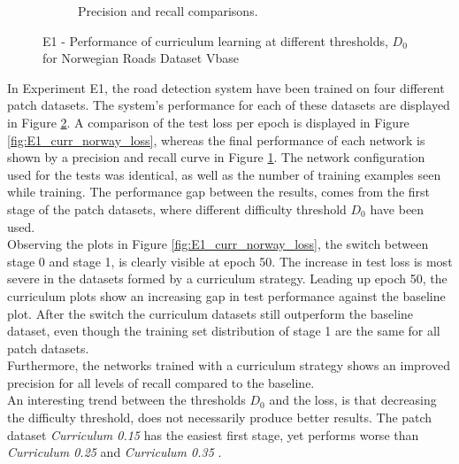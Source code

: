 \begin{figure}[!ht]
\begin{subfigure}{0.48\textwidth}
\caption{Precision and recall comparisons.} \label{fig:E1_curr_norway_pr}
\end{subfigure}
\hspace*{\fill} %
\caption{E1 - Performance of curriculum learning at different thresholds, $D_{0}$ for Norwegian Roads Dataset Vbase} \label{fig:E1_curriculum_norway}
\end{figure}

In Experiment E1, the road detection system have been trained on four different patch datasets. The system's performance for each of these datasets are displayed in Figure \ref{fig:E1_curriculum_norway}. A comparison of the test loss per epoch is displayed in Figure \ref{fig:E1_curr_norway_loss}, whereas the final performance of each network is shown by a precision and recall curve in Figure \ref{fig:E1_curr_norway_pr}. The network configuration used for the tests was identical, as well as the number of training examples seen while training. The performance gap between the results, comes from the first stage of the patch datasets, where different difficulty threshold $D_0$ have been used.\\



Observing the plots in Figure \ref{fig:E1_curr_norway_loss}, the switch between stage 0 and stage 1, is clearly visible at epoch 50. The increase in test loss is most severe in the datasets formed by a curriculum strategy. Leading up epoch 50, the curriculum plots show an increasing gap in test performance against the baseline plot. After the switch the curriculum datasets still outperform the baseline dataset, even though the training set distribution of stage 1 are the same for all patch datasets.\\

Furthermore, the networks trained with a curriculum strategy shows an improved precision for all levels of recall compared to the baseline. \\

An interesting trend between the thresholds $D_0$ and the loss, is that decreasing the difficulty threshold, does not necessarily produce better results. The patch dataset \textit{Curriculum 0.15} has the easiest first stage, yet performs worse than \textit{Curriculum 0.25} and \textit{Curriculum 0.35} . \\

